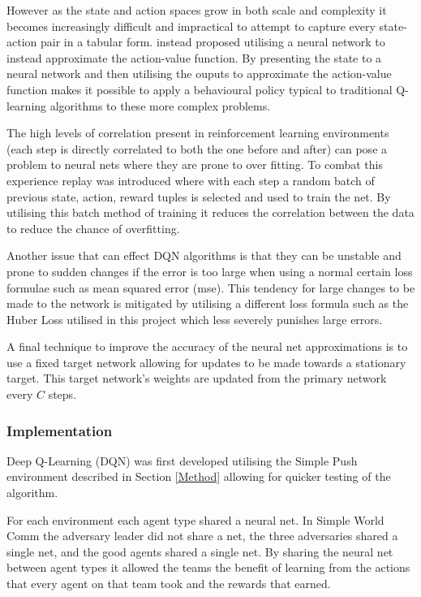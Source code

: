 \documentclass{article}
\begin{document}
However as the state and action spaces grow in both scale and complexity it becomes increasingly difficult and impractical to attempt to capture every state-action pair in a tabular form.
\citet{Mnih2015} instead proposed utilising a neural network to instead approximate the action-value function.
By presenting the state to a neural network and then utilising the ouputs to approximate the action-value function makes it possible to apply a behavioural policy typical to traditional Q-learning algorithms to these more complex problems.

The high levels of correlation present in reinforcement learning environments (each step is directly correlated to both the one before and after) can pose a problem to neural nets where they are prone to over fitting.
To combat this experience replay was introduced where with each step a random batch of previous state, action, reward tuples is selected and used to train the net.
By utilising this batch method of training it reduces the correlation between the data to reduce the chance of overfitting.

Another issue that can effect DQN algorithms is that they can be unstable and prone to sudden changes if the error is too large when using a normal certain loss formulae such as mean squared error (mse).
This tendency for large changes to be made to the network is mitigated by utilising a different loss formula such as the Huber Loss utilised in this project which less severely punishes large errors.

A final technique to improve the accuracy of the neural net approximations is to use a fixed target network allowing for updates to be made towards a stationary target.
This target network's weights are updated from the primary network every $C$ steps.


\subsubsection{Implementation} \label{DQN-Implementation}

Deep Q-Learning (DQN) was first developed utilising the Simple Push environment described in Section \ref{Method} allowing for quicker testing of the algorithm.

For each environment each agent type shared a neural net.
In Simple World Comm the adversary leader did not share a net, the three adversaries shared a single net, and the good agents shared a single net.
By sharing the neural net between agent types it allowed the teams the benefit of learning from the actions that every agent on that team took and the rewards that earned.
\end{document}
